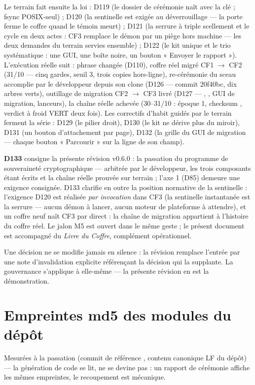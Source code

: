 Le terrain fait ensuite la loi : D119 (le dossier de cérémonie naît avec la clé ; fsync
POSIX-seul) ; D120 (la sentinelle est exigée au déverrouillage — la porte ferme le
coffre quand le témoin meurt) ; D121 (la serrure à triple scellement et le cycle en deux
actes : CF3 remplace le démon par un piège hors machine — les deux demandes du terrain
servies ensemble) ; D122 (le kit unique et le trio systématique : une GUI, une boîte
noire, un bouton « Envoyer le rapport »). L'exécution réelle suit : phrase changée
(D110), coffre réel migré CF1 $\to$ CF2 (31/10 — cinq gardes, seuil 3, trois copies
hors-ligne), re-cérémonie du sceau accomplie par le développeur depuis son clone
(D126 — commit 20f40bc, dix arbres verts), outillage de migration CF2 $\to$ CF3 livré
(D127 — , , GUI de migration, lanceurs), la chaîne
réelle achevée (30--31/10 : époque 1, checksum , verdict à froid VERT
deux fois). Les correctifs d'habit guidés par le terrain ferment la série : D129 (le
pilier droit), D130 (le kit ne dérive plus du miroir), D131 (un bouton d'attachement
par page), D132 (la grille du GUI de migration — chaque bouton « Parcourir » sur la
ligne de son champ).

\textbf{D133} consigne la présente révision v0.6.0 : la passation du programme de
souveraineté cryptographique — arbitrée par le développeur, les trois composants étant
écrits et la chaîne réelle prouvée sur terrain ; l'axe 1 (D85) demeure une exigence
consignée. D133 clarifie en outre la position normative de la sentinelle : l'exigence
D120 est réalisée \emph{par invocation} dans CF3 (la sentinelle instantanée est la
serrure — aucun démon à lancer, aucun moteur de plateforme à attendre), et un coffre
neuf naît CF3 par  direct : la chaîne de migration appartient à l'histoire du
coffre réel. Le jalon M5 est ouvert dans le même geste ; le présent document est
accompagné du \emph{Livre du Coffre}, complément opérationnel.

Une décision ne se modifie jamais en silence : la révision remplace l'entrée par une note
d'invalidation explicite référençant la décision qui la supplante. La gouvernance
s'applique à elle-même — la présente révision en est la démonstration.

\appendix
\section{Empreintes md5 des modules du dépôt}\label{sec:empreintes}

Mesurées à la passation (commit de référence , contenu canonique LF du
dépôt) — la génération de code se lit, ne se devine pas : un rapport de cérémonie
affiche les mêmes empreintes, le recoupement est mécanique.

